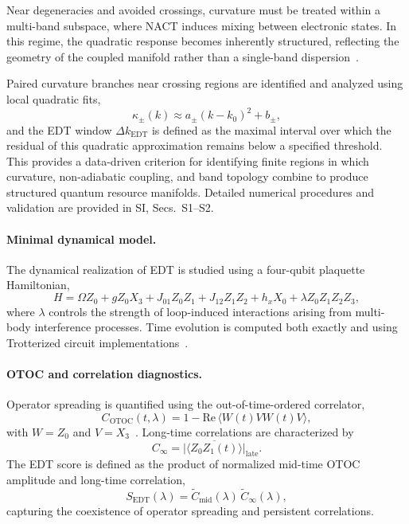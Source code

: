 \documentclass[twocolumn,10pt]{article}
\begin{document}
Near degeneracies and avoided crossings, curvature must be treated within a multi-band subspace, where NACT induces mixing between electronic states. In this regime, the quadratic response becomes inherently structured, reflecting the geometry of the coupled manifold rather than a single-band dispersion~\cite{Berry1984}.

Paired curvature branches near crossing regions are identified and analyzed using local quadratic fits,
\begin{equation}
\kappa_\pm(k) \approx a_\pm (k-k_0)^2 + b_\pm,
\end{equation}
and the EDT window $\Delta k_{\mathrm{EDT}}$ is defined as the maximal interval over which the residual of this quadratic approximation remains below a specified threshold. This provides a data-driven criterion for identifying finite regions in which curvature, non-adiabatic coupling, and band topology combine to produce structured quantum resource manifolds. Detailed numerical procedures and validation are provided in SI, Secs.~S1--S2.

\paragraph*{Minimal dynamical model.}

The dynamical realization of EDT is studied using a four-qubit plaquette Hamiltonian,
\begin{equation}
H = \Omega Z_0 + g Z_0 X_3 + J_{01} Z_0 Z_1 + J_{12} Z_1 Z_2 + h_x X_0 + \lambda Z_0 Z_1 Z_2 Z_3,
\end{equation}
where $\lambda$ controls the strength of loop-induced interactions arising from multi-body interference processes. Time evolution is computed both exactly and using Trotterized circuit implementations~\cite{Lloyd1996,Trotter1959,Suzuki1990,Childs2019}.

\paragraph*{OTOC and correlation diagnostics.}

Operator spreading is quantified using the out-of-time-ordered correlator,
\begin{equation}
C_{\mathrm{OTOC}}(t,\lambda) = 1 - \mathrm{Re}\,\langle W(t) V W(t) V \rangle,
\end{equation}
with $W = Z_0$ and $V = X_3$~\cite{Larkin1969,Maldacena2016,Swingle2018}. Long-time correlations are characterized by
\begin{equation}
C_\infty = \overline{|\langle Z_0 Z_1(t) \rangle|}_{\mathrm{late}}.
\end{equation}
The EDT score is defined as the product of normalized mid-time OTOC amplitude and long-time correlation,
\begin{equation}
S_{\mathrm{EDT}}(\lambda) = \tilde{C}_{\mathrm{mid}}(\lambda)\,\tilde{C}_\infty(\lambda),
\end{equation}
capturing the coexistence of operator spreading and persistent correlations.
\end{document}
